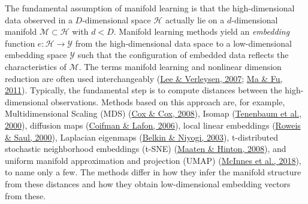 \documentclass[
  10pt]{article}
\newcommand{\M}{\mathcal{M}} 												%
\newcommand{\hdspace}{\mathcal{H}}
\newcommand{\embedspace}{\mathcal{Y}}
\newcommand{\mani}{\mathcal{M}}
\newcommand{\obsdim}{\ensuremath{D}}    %
\begin{document}
The fundamental assumption of manifold learning is that the high-dimensional data observed in a \(\obsdim\)-dimensional space \(\hdspace\) actually lie on a \(d\)-dimensional manifold \(\mani \subset \hdspace\) with \(d < \obsdim\). Manifold learning methods yield an \emph{embedding} function \(e:\hdspace \to \embedspace\) from the high-dimensional data space to a low-dimensional embedding space \(\embedspace\) such that the configuration of embedded data reflects the characteristics of \(\M\). The terms manifold learning and nonlinear dimension reduction are often used interchangeably (\protect\hyperlink{ref-lee2007nonlinear}{Lee \& Verleysen, 2007}; \protect\hyperlink{ref-ma2011manifold}{Ma \& Fu, 2011}).
Typically, the fundamental step is to compute distances between the high-dimensional observations. Methods based on this approach are, for example, Multidimensional Scaling (MDS) (\protect\hyperlink{ref-cox2008multidimensional}{Cox \& Cox, 2008}), Isomap (\protect\hyperlink{ref-tenenbaum2000global}{Tenenbaum et al., 2000}), diffusion maps (\protect\hyperlink{ref-coifman2006diffusion}{Coifman \& Lafon, 2006}), local linear embeddings (\protect\hyperlink{ref-roweis2000nonlinear}{Roweis \& Saul, 2000}), Laplacian eigenmaps (\protect\hyperlink{ref-belkin2003laplacian}{Belkin \& Niyogi, 2003}), t-distributed stochastic neighborhood embeddings (t-SNE) (\protect\hyperlink{ref-maaten2008visualizing}{Maaten \& Hinton, 2008}), and uniform manifold approximation and projection (UMAP) (\protect\hyperlink{ref-mcinnes2018umap}{McInnes et al., 2018}), to name only a few. The methods differ in how they infer the manifold structure from these distances and how they obtain low-dimensional embedding vectors from these.\\
\end{document}
